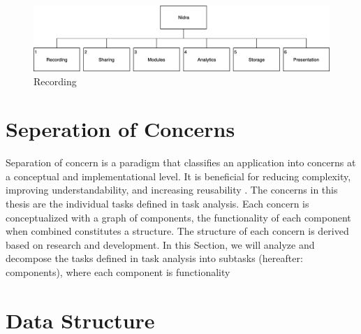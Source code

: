 \begin{figure}
    \centering
    \includegraphics[scale=0.23]{images/TA.png}
    \caption{Recording}
    \label{fig:hta_overview}
\end{figure}



\section{Seperation of Concerns}
Separation of concern is a paradigm that classifies an application into concerns at a conceptual and implementational level. It is beneficial for reducing complexity, improving understandability, and increasing reusability \cite{soc}. The concerns in this thesis are the individual tasks defined in task analysis. Each concern is conceptualized with a graph of components, the functionality of each component when combined constitutes a structure. The structure of each concern is derived based on research and development. In this Section, we will analyze and decompose the tasks defined in task analysis into subtasks (hereafter: components), where each component is functionality   



\section{Data Structure}


